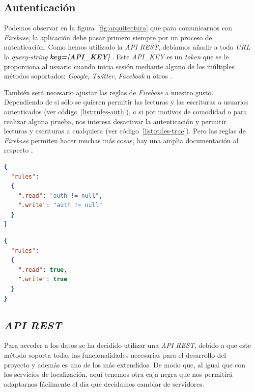 \subsection{Autenticación}
Podemos observar en la figura~\ref{fig:arquitectura} que para comunicarnos con \textit{Firebase}, la aplicación debe pasar primero siempre por un proceso de autenticación. Como hemos utilizado la \textit{API REST}, debíamos añadir a toda \textit{URL} la \textit{query-string} \textbf{\textit{key=[API\_KEY]} }\cite{noauthor_firebase_nodate-1}. Este \textit{API\_KEY} es un \textit{token} que se le proporciona al usuario cuando inicia sesión mediante alguno de los múltiples métodos soportados: \textit{Google}, \textit{Twitter}, \textit{Facebook} u otros \cite{noauthor_users_nodate}.

También será necesario ajustar las reglas de \textit{Firebase} a nuestro gusto. Dependiendo de si sólo se quieren permitir las lecturas y las escrituras a usuarios autenticados (ver código~\ref{list:rules-auth}), o si por motivos de comodidad o para realizar alguna prueba, nos interesa desactivar la autenticación y permitir lecturas y escrituras a cualquiera (ver código~\ref{list:rules-true}). Pero las reglas de \textit{Firebase} permiten hacer muchas más cosas, hay una amplia documentación al respecto \cite{noauthor_firebase_nodate}.

\begin{lstlisting}[language=json,style=interfaces,caption=Reglas Firebase que exigen estar autenticado para hacer cambios.,label={list:rules-auth}]
{
  "rules":
  {
    ".read": "auth != null",
    ".write": "auth != null"
  }
}
\end{lstlisting}

\begin{lstlisting}[language=json,style=interfaces,caption=Reglas Firebase que permiten leer y escribir a cualquier usuario.,label={list:rules-true}]
{
  "rules":
  {
    ".read": true,
    ".write": true
  }
}
\end{lstlisting}

\subsection{\textit{API REST}}
Para acceder a los datos se ha decidido utilizar una \textit{API REST}, debido a que este método soporta todas las funcionalidades necesarias para el desarrollo del proyecto y además es uno de los más extendidos. De modo que, al igual que con los servicios de localización, aquí tenemos otra caja negra que nos permitirá adaptarnos fácilmente el día que decidamos cambiar de servidores.

